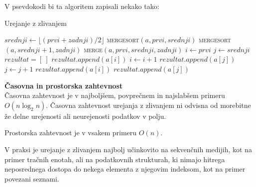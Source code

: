 \documentclass[a4paper,oneside]{article}
\begin{document}
V psevdokodi bi ta algoritem zapisali nekako tako:

\begin{algorithm}
  \caption{Urejanje z zlivanjem}\label{algo:mergesort}
  \begin{algorithmic}[1]
         \Return \EndIf
        \State $srednji \gets \lfloor(prvi + zadnji) / 2\rfloor$
        \State \textsc{mergesort}$(a, prvi, srednji)$
        \State \textsc{mergesort}$(a, srednji + 1, zadnji)$
        \State \textsc{merge}$(a, prvi, srednji, zadnji)$
    \EndFunction
        \State $i \gets prvi$
        \State $j \gets srednji$
        \State $rezultat = [\ ]$ 
                \State $rezultat.append(a[i])$ 
                \State $i \gets i + 1$
            \Else
                \State $rezultat.append(a[j])$ 
                \State $j \gets j + 1$
            \EndIf
        \EndWhile
            \State $rezultat.append(a[i])$ 
        \EndWhile
            \State $rezultat.append(a[j])$ 
        \EndWhile
    \EndFunction
  \end{algorithmic}
\end{algorithm}

\textbf{Časovna in prostorska zahtevnost} \\
Časovna zahtevnost je v najboljšem, povprečnem in najslabšem primeru 
$O(n\log_2 n)$. Časovna zahtevnost urejanja z zlivanjem ni odvisna od
morebitne že delne urejenosti ali neurejenosti podatkov v polju. 

Prostorska zahtevnost je v vsakem primeru $O(n)$. %

V praksi je urejanje z zlivanjem najbolj učinkovito na
sekvenčnih medijih, kot na primer tračnih enotah, ali na podatkovnih strukturah, ki nimajo hitrega
neposrednega dostopa do nekega elementa z njegovim indeksom, kot na primer povezani seznami.
\end{document}
